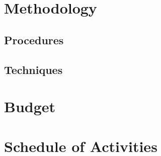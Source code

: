 \section{Methodology} \label{sec:Methodology}



\subsection{Procedures}



\subsection{Techniques}



\section{Budget} \label{sec:budget}


\section{Schedule of Activities} \label{sec:schedule_activities_table}

